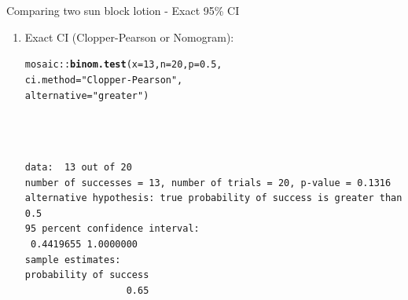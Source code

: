 \documentclass{beamer}\usepackage[]{graphicx}\usepackage[]{color}
\newcommand{\hlnum}[1]{\textcolor[rgb]{0.686,0.059,0.569}{#1}}%
\newcommand{\hlstr}[1]{\textcolor[rgb]{0.192,0.494,0.8}{#1}}%
\newcommand{\hlopt}[1]{\textcolor[rgb]{0,0,0}{#1}}%
\newcommand{\hlstd}[1]{\textcolor[rgb]{0.345,0.345,0.345}{#1}}%
\newcommand{\hlkwc}[1]{\textcolor[rgb]{0.333,0.667,0.333}{#1}}%
\newcommand{\hlkwd}[1]{\textcolor[rgb]{0.737,0.353,0.396}{\textbf{#1}}}%
\newenvironment{knitrout}{}{} %
\begin{document}
\begin{frame}[fragile]{Comparing two sun block lotion - Exact 95\% CI}
\small
\begin{enumerate}
	\setlength\itemsep{1em}
	
	\item Exact CI (Clopper-Pearson or Nomogram):
\begin{knitrout}\scriptsize
{}\color{fgcolor}
\begin{alltt}
\hlstd{mosaic}\hlopt{::}\hlkwd{binom.test}\hlstd{(}\hlkwc{x} \hlstd{=} \hlnum{13}\hlstd{,} \hlkwc{n} \hlstd{=} \hlnum{20}\hlstd{,} \hlkwc{p} \hlstd{=} \hlnum{0.5}\hlstd{,}
\hlkwc{ci.method} \hlstd{=} \hlstr{"Clopper-Pearson"}\hlstd{,}
\hlkwc{alternative} \hlstd{=} \hlstr{"greater"}\hlstd{)}
\end{alltt}
\begin{verbatim}



data:  13 out of 20
number of successes = 13, number of trials = 20, p-value = 0.1316
alternative hypothesis: true probability of success is greater than 0.5
95 percent confidence interval:
 0.4419655 1.0000000
sample estimates:
probability of success 
                  0.65 
\end{verbatim}

\end{knitrout}
	

	
\end{enumerate}

\end{frame}
\end{document}
